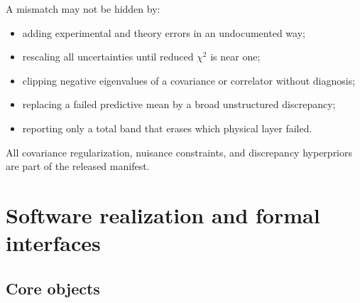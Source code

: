 \documentclass[11pt]{article}
\begin{document}
A mismatch may not be hidden by:
\begin{itemize}
\item adding experimental and theory errors in an undocumented way;
\item rescaling all uncertainties until reduced \(\chi^2\) is near one;
\item clipping negative eigenvalues of a covariance or correlator without
diagnosis;
\item replacing a failed predictive mean by a broad unstructured discrepancy;
\item reporting only a total band that erases which physical layer failed.
\end{itemize}
All covariance regularization, nuisance constraints, and discrepancy
hyperpriors are part of the released manifest.


\section{Software realization and formal interfaces}
\label{sec:software}

\subsection{Core objects}
\end{document}
